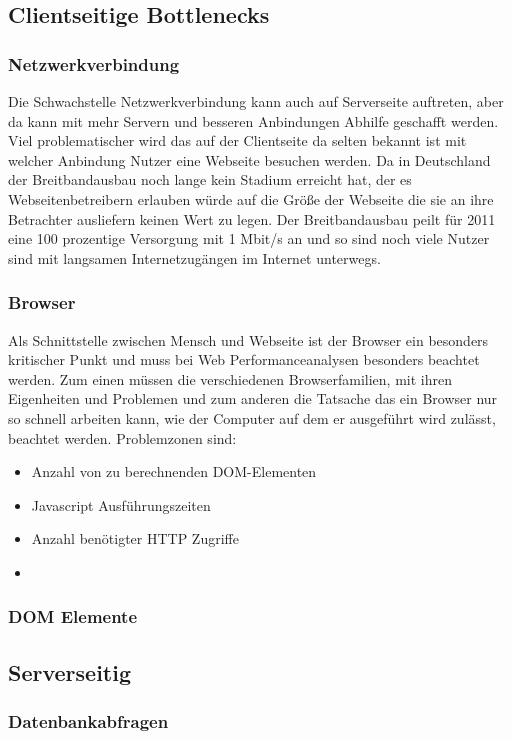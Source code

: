 \subsection{Clientseitige Bottlenecks}
\subsubsection{Netzwerkverbindung}Die Schwachstelle Netzwerkverbindung kann auch auf Serverseite auftreten, aber da kann mit mehr Servern und besseren Anbindungen Abhilfe geschafft werden. Viel problematischer wird das auf der Clientseite da selten bekannt ist mit welcher Anbindung Nutzer eine Webseite besuchen werden.%
Da in Deutschland der Breitbandausbau noch lange kein Stadium erreicht hat, der es Webseitenbetreibern erlauben würde auf die Größe der Webseite die sie an ihre Betrachter ausliefern keinen Wert zu legen. Der Breitbandausbau peilt für 2011 eine 100 prozentige Versorgung mit 1 Mbit/s an und so sind noch viele Nutzer sind mit langsamen Internetzugängen im Internet unterwegs. 

\subsubsection{Browser}
Als Schnittstelle zwischen Mensch und Webseite ist der Browser ein besonders kritischer Punkt und muss bei Web Performanceanalysen besonders beachtet werden. Zum einen müssen die verschiedenen Browserfamilien, mit ihren Eigenheiten und Problemen und zum anderen die Tatsache das ein Browser nur so schnell arbeiten kann, wie der Computer auf dem er ausgeführt wird zulässt, beachtet werden. Problemzonen sind:
\begin{itemize}
  \item Anzahl von zu berechnenden DOM-Elementen
  \item Javascript Ausführungszeiten
  \item Anzahl benötigter HTTP Zugriffe
  \item 

\end{itemize}

\subsubsection{DOM Elemente}
\subsection{Serverseitig}
\subsubsection{Datenbankabfragen}
